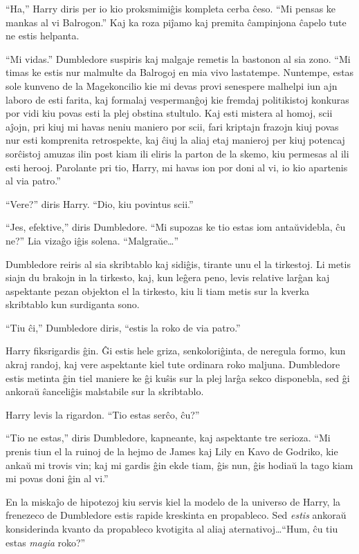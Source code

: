 ``Ha,'' Harry diris per io kio proksmimiĝis kompleta cerba ĉeso. ``Mi
pensas ke mankas al vi Balrogon.'' Kaj ka roza piĵamo kaj premita
ĉampinjona ĉapelo tute ne estis helpanta.

``Mi vidas.'' Dumbledore suspiris kaj malgaje remetis la bastonon al
sia zono. ``Mi timas ke estis nur malmulte da Balrogoj en mia vivo
lastatempe. Nuntempe, estas sole kunveno de la Magekoncilio kie mi
devas provi senespere malhelpi iun ajn laboro de esti farita, kaj
formalaj vespermanĝoj kie fremdaj politikistoj konkuras por vidi kiu
povas esti la plej obstina stultulo. Kaj esti mistera al homoj, scii
aĵojn, pri kiuj mi havas neniu maniero por scii, fari kriptajn frazojn
kiuj povas nur esti komprenita retrospekte, kaj ĉiuj la aliaj etaj
manieroj per kiuj potencaj sorĉistoj amuzas ilin post kiam ili eliris
la parton de la skemo, kiu permesas al ili esti herooj. Parolante pri
tio, Harry, mi havas ion por doni al vi, io kio apartenis al via
patro.''

``Vere?'' diris Harry. ``Dio, kiu povintus scii.''

``Jes, efektive,'' diris Dumbledore. ``Mi supozas ke tio estas iom
antaŭvidebla, ĉu ne?'' Lia vizaĝo iĝis solena. ``Malgraŭe\ldots''

Dumbledore reiris al sia skribtablo kaj sidiĝis, tirante unu el la
tirkestoj. Li metis siajn du brakojn in la tirkesto, kaj, kun leĝera
peno, levis relative larĝan kaj aspektante pezan objekton el la
tirkesto, kiu li tiam metis sur la kverka skribtablo kun surdiganta
sono.

``Tiu ĉi,'' Dumbledore diris, ``estis la roko de via patro.''

Harry fiksrigardis ĝin. Ĝi estis hele griza, senkoloriĝinta, de
neregula formo, kun akraj randoj, kaj vere aspektante kiel tute
ordinara roko maljuna. Dumbledore estis metinta ĝin tiel maniere ke ĝi
kuŝis sur la plej larĝa sekco disponebla, sed ĝi ankoraŭ ŝanceliĝis
malstabile sur la skribtablo.

Harry levis la rigardon. ``Tio estas serĉo, ĉu?''

``Tio ne estas,'' diris Dumbledore, kapneante, kaj aspektante tre
serioza. ``Mi prenis tiun el la ruinoj de la hejmo de James kaj Lily
en Kavo de Godriko, kie ankaŭ mi trovis vin; kaj mi gardis ĝin ekde
tiam, ĝis nun, ĝis hodiaŭ la tago kiam mi povas doni ĝin al vi.''

En la miskaĵo de hipotezoj kiu servis kiel la modelo de la universo de
Harry, la frenezeco de Dumbledore estis rapide kreskinta en
propableco. Sed \emph{estis} ankoraŭ konsiderinda kvanto da propableco
kvotigita al aliaj aternativoj\ldots ``Hum, ĉu tiu estas \emph{magia}
roko?''

